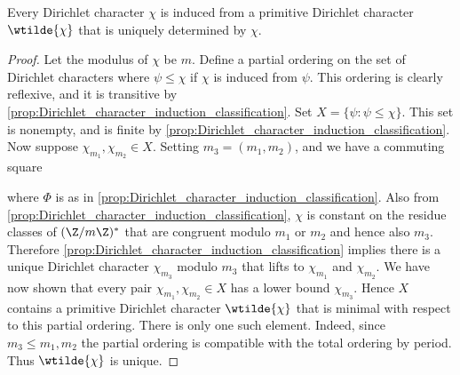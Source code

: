       \begin{theorem}\label{thm:Dirichlet_character_conductor_existance}
        Every Dirichlet character $\chi$ is induced from a primitive Dirichlet character $\wtilde{\chi}$ that is uniquely determined by $\chi$.
      \end{theorem}
      \begin{proof}
        Let the modulus of $\chi$ be $m$. Define a partial ordering on the set of Dirichlet characters where $\psi \le \chi$ if $\chi$ is induced from $\psi$. This ordering is clearly reflexive, and it is transitive by \cref{prop:Dirichlet_character_induction_classification}. Set $X = \{\psi:\psi \le \chi\}$. This set is nonempty, and is finite by \cref{prop:Dirichlet_character_induction_classification}. Now suppose $\chi_{m_{1}},\chi_{m_{2}} \in X$. Setting $m_{3} = (m_{1},m_{2})$, and we have a commuting square
        \begin{center}
        \end{center}
        where $\Phi$ is as in \cref{prop:Dirichlet_character_induction_classification}. Also from \cref{prop:Dirichlet_character_induction_classification}, $\chi$ is constant on the residue classes of $(\Z/m\Z)^{\ast}$ that are congruent modulo $m_{1}$ or $m_{2}$ and hence also $m_{3}$. Therefore \cref{prop:Dirichlet_character_induction_classification} implies there is a unique Dirichlet character $\chi_{m_{3}}$ modulo $m_{3}$ that lifts to $\chi_{m_{1}}$ and $\chi_{m_{2}}$. We have now shown that every pair $\chi_{m_{1}},\chi_{m_{2}} \in X$ has a lower bound $\chi_{m_{3}}$. Hence $X$ contains a primitive Dirichlet character $\wtilde{\chi}$ that is minimal with respect to this partial ordering. There is only one such element. Indeed, since $m_{3} \le m_{1},m_{2}$ the partial ordering is compatible with the total ordering by period. Thus $\wtilde{\chi}$ is unique.
      \end{proof}

